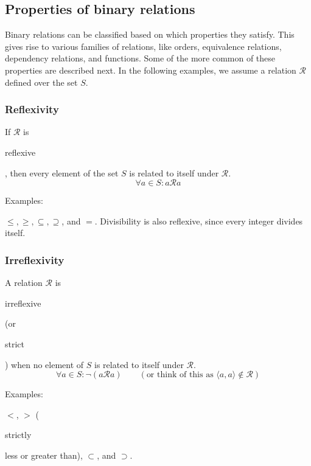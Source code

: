 \documentclass[11pt]{article}
\theoremstyle{plain}
\theoremstyle{definition}
\begin{document}
\subsection*{Properties of binary relations}

Binary relations can be classified based on which properties they satisfy. 
This gives rise to various families of relations, like orders, equivalence relations, dependency relations, and functions. Some of the more common of these properties are described next. 
In the following examples, we assume a relation $ \mathcal{R} $ defined over the set $ S $.

\subsubsection*{ Reflexivity}

If $ \mathcal{R} $ is \begin{em}reflexive\end{em}, then every element of the set $ S $ is related to itself under $ \mathcal{R} $. 
\begin{displaymath}
  \forall a \in S : a\mathcal{R}a 
\end{displaymath}

\noindent \begin{em}Examples:\end{em} $ \le, \ge, \subseteq, \supseteq $, and $ = $. Divisibility is also reflexive, since every integer divides itself. 

\subsubsection*{ Irreflexivity}

A relation $ \mathcal{R} $ is \begin{em}irreflexive\end{em} (or \begin{em}strict\end{em}) when no element of $ S $ is related to itself under $ \mathcal{R} $. %
\begin{displaymath}
  \forall a \in S : \neg(a\mathcal{R}a) \quad \quad (\text{or think of this as } \langle a, a \rangle \notin \mathcal{R} )
\end{displaymath}

\noindent \begin{em}Examples:\end{em} $ < $, $ > $ (\begin{em}strictly\end{em} less or greater than), $ \subset $, and $ \supset $.
\end{document}
